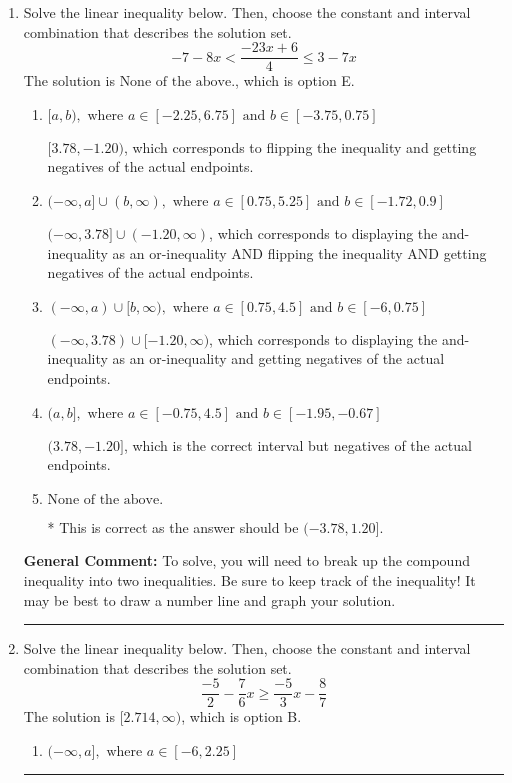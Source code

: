 \documentclass{extbook}[14pt]
\newcommand{\litem}[1]{\item #1

\rule{\textwidth}{0.4pt}}
\begin{document}
\begin{enumerate}
{\textbf{General Comment:} When thinking about this language, it helps to draw a number line and try points.
}
\litem{
Solve the linear inequality below. Then, choose the constant and interval combination that describes the solution set.
\[ -7 - 8 x < \frac{-23 x + 6}{4} \leq 3 - 7 x \]The solution is \( \text{None of the above.} \), which is option E.\begin{enumerate}[label=\Alph*.]
\item \( [a, b), \text{ where } a \in [-2.25, 6.75] \text{ and } b \in [-3.75, 0.75] \)

$[3.78, -1.20)$, which corresponds to flipping the inequality and getting negatives of the actual endpoints.
\item \( (-\infty, a] \cup (b, \infty), \text{ where } a \in [0.75, 5.25] \text{ and } b \in [-1.72, 0.9] \)

$(-\infty, 3.78] \cup (-1.20, \infty)$, which corresponds to displaying the and-inequality as an or-inequality AND flipping the inequality AND getting negatives of the actual endpoints.
\item \( (-\infty, a) \cup [b, \infty), \text{ where } a \in [0.75, 4.5] \text{ and } b \in [-6, 0.75] \)

$(-\infty, 3.78) \cup [-1.20, \infty)$, which corresponds to displaying the and-inequality as an or-inequality and getting negatives of the actual endpoints.
\item \( (a, b], \text{ where } a \in [-0.75, 4.5] \text{ and } b \in [-1.95, -0.67] \)

$(3.78, -1.20]$, which is the correct interval but negatives of the actual endpoints.
\item \( \text{None of the above.} \)

* This is correct as the answer should be $(-3.78, 1.20]$.
\end{enumerate}

\textbf{General Comment:} To solve, you will need to break up the compound inequality into two inequalities. Be sure to keep track of the inequality! It may be best to draw a number line and graph your solution.
}
\litem{
Solve the linear inequality below. Then, choose the constant and interval combination that describes the solution set.
\[ \frac{-5}{2} - \frac{7}{6} x \geq \frac{-5}{3} x - \frac{8}{7} \]The solution is \( [2.714, \infty) \), which is option B.\begin{enumerate}[label=\Alph*.]
\item \( (-\infty, a], \text{ where } a \in [-6, 2.25] \)


\end{enumerate}}
\end{enumerate}
\end{document}
